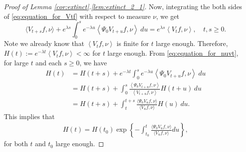 \documentclass[12pt,a4paper]{amsart}
\numberwithin{equation}{section}
\theoremstyle{plain}
\theoremstyle{definition}
\begin{document}
\begin{proof}[Proof of Lemma \ref{cor:extinct}.\eqref{lem:extinct_2_1}]
Now,  integrating the both sides of \eqref{eq:equation_for_Vtf} with respect to measure $\nu$, we get
\begin{equation}
\label{eq:equation_for_nuvt}
    \langle V_{t+s}f, \nu\rangle + e^{\lambda s}\int_0^s e^{-\lambda u}\left\langle \Psi_0 V_{t+u} f,\nu\right\rangle~du
    = e^{\lambda s}\left\langle V_tf,\nu \right\rangle,
\quad t,s \geq 0.
\end{equation}  
Note we already know that $\left\langle V_tf,\nu \right\rangle$ is finite for $t$ large enough.
Therefore, $H(t):=e^{-\lambda t}\left\langle V_tf,\nu \right\rangle<\infty$ for $t$ large enough.
From \eqref{eq:equation_for_nuvt}, for large $t$ and each $s\geq 0$, we have 
\begin{align}
H(t)
&= H(t+s) + e^{-\lambda t}\int_0^{s} e^{-\lambda u} \left\langle\Psi_0 V_{t+u}f,\nu\right\rangle~du
\\&=H(t+s) + \int_0^{s}  \frac{\left\langle\Psi_0 V_{t+u} f,\nu\right\rangle}{ \left\langle V_{t+u} f,\nu \right\rangle } H(t+u)~du   
\\&=H(t+s) + \int_t^{t+s}\frac{\langle\Psi_0 V_uf,\nu\rangle}{\langle V_uf,\nu\rangle}H(u)~du. 
\end{align}
This implies that 
\begin{align}
\label{eq:Ht}
H(t)
=H(t_0) \exp\left\{-\int_{t_0}^t\frac{\langle\Psi_0 V_uf,\nu\rangle}{\langle V_uf,\nu\rangle}du\right\},
\end{align}
for both $t$ and $t_0$ large enough.  


\end{proof}
\end{document}
